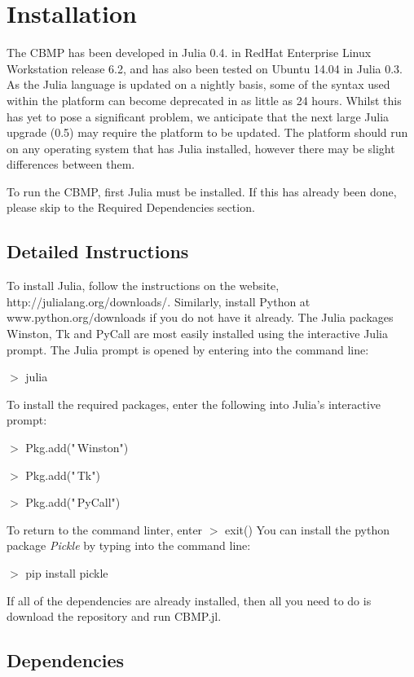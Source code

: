 \documentclass[11.5pt]{article}
\begin{document}
\section{Installation}
The CBMP has been developed in Julia 0.4. in RedHat Enterprise Linux 
Workstation release 6.2, and has also been tested on Ubuntu 14.04 in 
Julia 0.3. As the Julia language is updated on a nightly basis, some of 
the syntax used within the platform can become deprecated in as little 
as 24 hours. Whilst this has yet to pose a significant problem, we 
anticipate that the next large Julia upgrade (0.5) may require the 
platform to be updated. The platform should run on any operating system 
that has Julia installed, however there may be slight differences 
between them.

To run the CBMP, first Julia must be installed. If this has already been 
done, please skip to the Required Dependencies section.

\subsection{Detailed Instructions}
To install Julia, follow the instructions on the website, 
http://julialang.org/downloads/. Similarly,
install Python at www.python.org/downloads if you do not have it already. 
The Julia packages Winston, Tk and PyCall are most easily installed 
using the interactive Julia prompt. The Julia prompt is opened by entering
into the command line:

{\fontsize{11pt}{11pt} \ttfamily 
$>$ julia}

To install the required packages, enter the following into Julia's interactive prompt:

{\fontsize{11pt}{11pt} \ttfamily 
$>$ Pkg.add("\,Winston")

$>$ Pkg.add("\,Tk")

$>$ Pkg.add("\,PyCall")}

To return to the command linter, enter
{\fontsize{11pt}{11pt} \ttfamily 
$>$ exit()}
You can install the python package {\itshape Pickle} by typing into the 
command line:

{\fontsize{11pt}{11pt} \ttfamily 
$>$ pip install pickle}

If all of the dependencies are already installed, then all you need to 
do is download the repository and run CBMP.jl.



\subsection{Dependencies}
\end{document}
